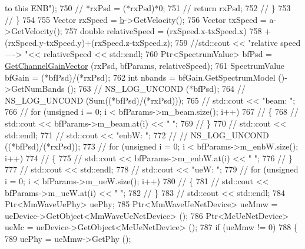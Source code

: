 \begin{DoxyCode}
{       to this ENB");}
750                 \textcolor{comment}{//      *rxPsd = (*rxPsd)*0;}
751                 \textcolor{comment}{//      return rxPsd;}
752 \textcolor{comment}{//              \}}
753 \textcolor{comment}{//      \}}
754 
755         Vector rxSpeed = \hyperlink{buildings__pathloss_8m_a21ad0bd836b90d08f4cf640b4c298e7c}{b}->GetVelocity();
756         Vector txSpeed = a->GetVelocity();
757         \textcolor{keywordtype}{double} relativeSpeed = (rxSpeed.x-txSpeed.x)
758                         +(rxSpeed.y-txSpeed.y)+(rxSpeed.z-txSpeed.z);
759 \textcolor{comment}{//std::cout << "relative speed ---->  "<< relativeSpeed << std::endl;}
760         Ptr<SpectrumValue> bfPsd = \hyperlink{classns3_1_1MmWaveBeamforming_a874dc6be592a7e9665bf855990f6f1b4}{GetChannelGainVector} (rxPsd, bfParams,  
      relativeSpeed);
761         SpectrumValue bfGain = (*bfPsd)/(*rxPsd);
762         \textcolor{keywordtype}{int} nbands = bfGain.GetSpectrumModel ()->GetNumBands ();
763 \textcolor{comment}{//      NS\_LOG\_UNCOND (*bfPsd);}
764 \textcolor{comment}{//      NS\_LOG\_UNCOND (Sum((*bfPsd)/(*rxPsd)));}
765 \textcolor{comment}{//      std::cout << "beam: ";}
766 \textcolor{comment}{//      for (unsigned i = 0; i < bfParams->m\_beam.size(); i++)}
767 \textcolor{comment}{//      \{}
768 \textcolor{comment}{//              std::cout << bfParams->m\_beam.at(i) << " ";}
769 \textcolor{comment}{//      \}}
770 \textcolor{comment}{//      std::cout << std::endl;}
771 \textcolor{comment}{//      std::cout << "enbW: ";}
772 \textcolor{comment}{//      //      NS\_LOG\_UNCOND ((*bfPsd)/(*rxPsd));}
773 \textcolor{comment}{//      for (unsigned i = 0; i < bfParams->m\_enbW.size(); i++)}
774 \textcolor{comment}{//      \{}
775 \textcolor{comment}{//              std::cout << bfParams->m\_enbW.at(i) << " ";}
776 \textcolor{comment}{//      \}}
777 \textcolor{comment}{//      std::cout << std::endl;}
778 \textcolor{comment}{//      std::cout << "ueW: ";}
779 \textcolor{comment}{//      for (unsigned i = 0; i < bfParams->m\_ueW.size(); i++)}
780 \textcolor{comment}{//              \{}
781 \textcolor{comment}{//                      std::cout << bfParams->m\_ueW.at(i) << " ";}
782 \textcolor{comment}{//              \}}
783 \textcolor{comment}{//              std::cout << std::endl;}
784         Ptr<MmWaveUePhy> uePhy;
785         Ptr<MmWaveUeNetDevice> ueMmw = ueDevice->GetObject<MmWaveUeNetDevice> ();
786         Ptr<McUeNetDevice> ueMc = ueDevice->GetObject<McUeNetDevice> ();
787         \textcolor{keywordflow}{if} (ueMmw != 0) 
788         \{
789                 uePhy = ueMmw->GetPhy ();

\end{DoxyCode}
